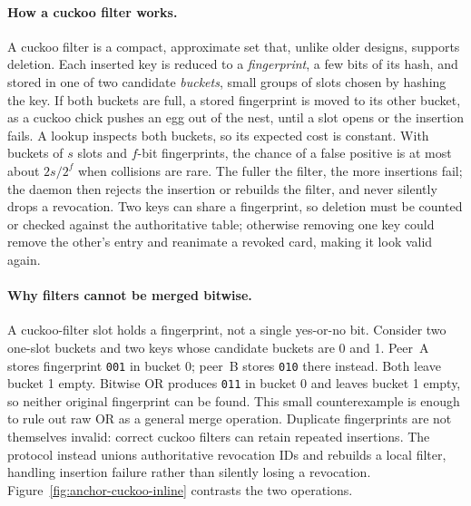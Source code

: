 \documentclass[11pt,a4paper]{article}
\theoremstyle{definition}
\begin{document}
\paragraph{How a cuckoo filter works.} A cuckoo filter is a compact, approximate set that, unlike older designs, supports deletion. Each inserted key is reduced to a \emph{fingerprint}, a few bits of its hash, and stored in one of two candidate \emph{buckets}, small groups of slots chosen by hashing the key. If both buckets are full, a stored fingerprint is moved to its other bucket, as a cuckoo chick pushes an egg out of the nest, until a slot opens or the insertion fails. A lookup inspects both buckets, so its expected cost is constant. With buckets of $s$ slots and $f$-bit fingerprints, the chance of a false positive is at most about $2s/2^f$ when collisions are rare. The fuller the filter, the more insertions fail; the daemon then rejects the insertion or rebuilds the filter, and never silently drops a revocation. Two keys can share a fingerprint, so deletion must be counted or checked against the authoritative table; otherwise removing one key could remove the other's entry and reanimate a revoked card, making it look valid again.

\paragraph{Why filters cannot be merged bitwise.} A cuckoo-filter slot holds
a fingerprint, not a single yes-or-no bit. Consider two one-slot
buckets and two keys whose candidate buckets are 0 and 1. Peer~A stores
fingerprint \texttt{001} in bucket 0; peer~B stores \texttt{010} there instead.
Both leave bucket 1 empty. Bitwise OR produces \texttt{011} in bucket 0 and
leaves bucket 1 empty, so neither original fingerprint can be found. This
small counterexample is enough to rule out raw OR as a general merge operation.
Duplicate fingerprints are not themselves invalid: correct cuckoo filters
can retain repeated insertions. The protocol instead unions authoritative
revocation IDs and rebuilds a local filter, handling insertion failure rather
than silently losing a revocation. Figure~\ref{fig:anchor-cuckoo-inline}
contrasts the two operations.


\end{document}
